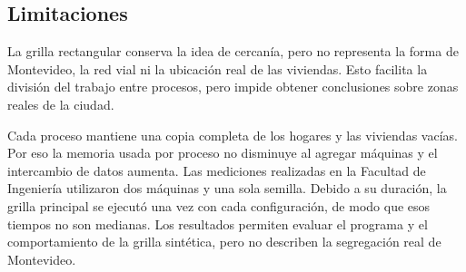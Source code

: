 \subsection{Limitaciones}

La grilla rectangular conserva la idea de cercanía, pero no representa la forma de Montevideo, la red vial ni la ubicación real de las viviendas. Esto facilita la división del trabajo entre procesos, pero impide obtener conclusiones sobre zonas reales de la ciudad.

Cada proceso mantiene una copia completa de los hogares y las viviendas vacías. Por eso la memoria usada por proceso no disminuye al agregar máquinas y el intercambio de datos aumenta. Las mediciones realizadas en la Facultad de Ingeniería utilizaron dos máquinas y una sola semilla. Debido a su duración, la grilla principal se ejecutó una vez con cada configuración, de modo que esos tiempos no son medianas. Los resultados permiten evaluar el programa y el comportamiento de la grilla sintética, pero no describen la segregación real de Montevideo.
